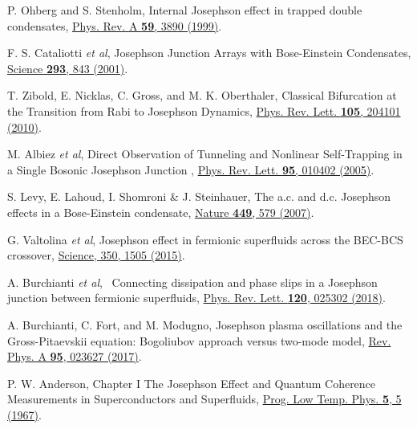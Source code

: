 \documentclass[twocolumn,prl,floatfix,citeautoscript,nofootinbib,superscriptaddress]{revtex4}
\begin{document}
\begin{thebibliography}{99}
 P. Ohberg and S. Stenholm, {Internal Josephson effect
in trapped double condensates}, \href{https://doi.org/10.1103/PhysRevA.59.3890}%
{Phys. Rev. A \textbf{59}, 3890 (1999)}.

 F. S. Cataliotti \textit{et al}, {Josephson
Junction Arrays with Bose-Einstein Condensates}, \href{https://doi.org/10.1126/science.1062612}%
{Science \textbf{293}, 843 (2001)}.

 T. Zibold, E. Nicklas, C. Gross, and M. K. Oberthaler, {%
Classical Bifurcation at the Transition from Rabi to Josephson Dynamics},
\href{https://doi.org/10.1103/PhysRevLett.105.204101}{Phys. Rev. Lett.
\textbf{105}, 204101 (2010)}.


 M. Albiez \textit{et al}, {Direct Observation of
Tunneling and Nonlinear Self-Trapping in a Single Bosonic Josephson Junction}%
, \href{https://doi.org/10.1103/PhysRevLett.95.010402}{Phys. Rev. Lett.
\textbf{95}, 010402 (2005)}.

 S. Levy, E. Lahoud, I. Shomroni \& J. Steinhauer, {The
a.c. and d.c. Josephson effects in a Bose-Einstein condensate}, \href{https://doi.org/10.1038/nature06186}%
{Nature \textbf{449}, 579 (2007)}.


 G. Valtolina \textit{et al}, {Josephson effect in
fermionic superfluids across the BEC-BCS crossover}, \href{https://doi.org/10.1126/science.aac9725}%
{Science, 350, 1505 (2015)}.

 A. Burchianti \textit{et al}, {\ Connecting
dissipation and phase slips in a Josephson junction between fermionic
superfluids}, \href{https://doi.org/10.1103/PhysRevLett.120.025302}{Phys.
Rev. Lett. \textbf{120}, 025302 (2018)}.

 A. Burchianti, C. Fort, and M. Modugno, Josephson
plasma oscillations and the Gross-Pitaevskii equation: Bogoliubov approach
versus two-mode model, \href{https://doi.org/10.1103/PhysRevA.95.023627}{%
Rev. Phys. A \textbf{95}, 023627 (2017)}.

 P. W. Anderson, {Chapter I The Josephson Effect and
Quantum Coherence Measurements in Superconductors and Superfluids}, \href{https://doi.org/10.1016/S0079-6417(08)60119-5}%
{Prog. Low Temp. Phys. \textbf{5}, 5 (1967)}.



\end{thebibliography}
\end{document}
